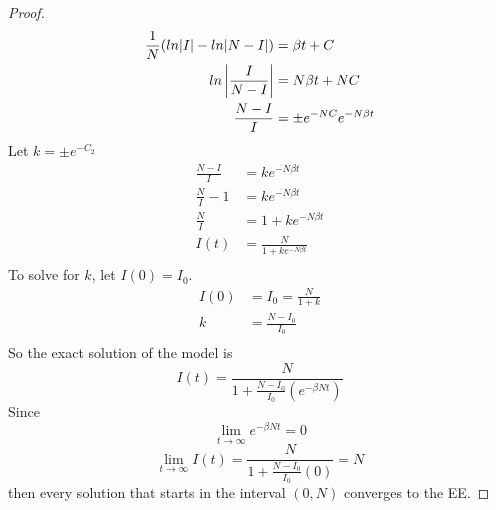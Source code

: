 \begin{proof}
\begin{align*}
        \frac{1}{N}(ln|I|- ln|N-I|)                     &= \beta t + C\\
        ln\left|\frac{I}{N-I}\right|                           &= N \beta t + NC\\
        \frac{N-I}{I}                                   &= \pm e^{-NC}e^{-N\beta t}\\
    \end{align*}
    Let $k = \pm e^{-C_2}$\\
    \begin{align*}
        \frac{N-I}{I} 	      &= ke^{-N\beta t}\\
        \frac{N}{I} - 1         &= ke^{-N\beta t}\\
        \frac{N}{I} 	      &= 1 + ke^{-N\beta t}\\
        I(t) 			      &= \frac{N}{1 + ke^{-N\beta t}}\\
    \end{align*}
    To solve for $k$, let $I(0) = I_0$.\\
    \begin{align*}
        I(0) 	&= I_0 = \frac{N}{1 + k}\\
        k 		&= \frac{N - I_0}{I_0}\\
    \end{align*}
    So the exact solution of the model is
    \begin{equation}
      I(t) =  \frac{N}{1+\frac{N-I_0}{I_0}(e^{-\beta N t})}
    \end{equation}
    Since
    $$\lim_{t\to\infty} e^{-\beta N t} = 0$$
    $$\lim_{t\to\infty} I(t) = \frac{N}{1 +\frac{N-I_0}{I_0}(0)} = N$$
    then every solution that starts in the interval $(0, N)$ converges to the EE.
\end{proof}

